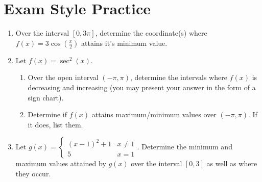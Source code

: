 \documentclass{article}
\begin{document}
\section*{Exam Style Practice}
\begin{enumerate}
    \item Over the interval $[0, 3\pi]$, determine the coordinate(s) where $f(x) = 3\cos(\frac{x}{2})$ attains it's minimum value.
    \vfill
    \item Let $f(x) = \sec^2(x)$.
    \begin{enumerate}
        \item Over the open interval $(-\pi, \pi)$, determine the intervals where $f(x)$ is decreasing and increasing (you may present your answer in the form of a sign chart).
        \vfill
        \item Determine if $f(x)$ attains maximum/minimum values over $(-\pi, \pi)$. If it does, list them.
        \vfill
    \end{enumerate}
    \item Let $g(x) = \begin{cases}
        (x-1)^2+1 & x \ne 1\\
        5 & x=1
    \end{cases}$. Determine the minimum and maximum values attained by $g(x)$ over the interval $[0, 3]$ as well as where they occur.
    \vfill
\end{enumerate}
\end{document}
